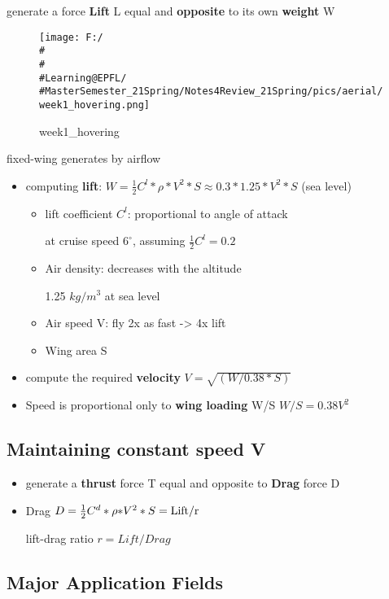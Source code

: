 \documentclass[]{article}
\begin{document}
generate a force \textbf{Lift} L equal and \textbf{opposite} to its own
\textbf{weight} W

\begin{figure}
\centering
\texttt{[image: F:/\\\#\\\#\\\#Learning@EPFL/\\\#MasterSemester\_21Spring/Notes4Review\_21Spring/pics/aerial/week1\_hovering.png]}
\caption{week1\_hovering}
\end{figure}

fixed-wing generates by airflow

\begin{itemize}
\item
  computing \textbf{lift}:
  \(W=\frac{1}{2} C^{l} * \rho {*} V^{2} * S \approx 0.3 * 1.25 * V^2 * S\)
  (sea level)

  \begin{itemize}
  \item
    lift coefficient \(C^{l}\): proportional to angle of attack

    at cruise speed \(6^{\circ}\), assuming \(\frac{1}{2} C^{l}= 0.2\) 
  \item
    Air density: decreases with the altitude

    1.25 \(kg/m^3\) at sea level
  \item
    Air speed V: fly 2x as fast -\textgreater{} 4x lift
  \item
    Wing area S
  \end{itemize}
\item
  compute the required \textbf{velocity} \(V = \sqrt{(W / 0.38 * S)}\)
\item
  Speed is proportional only to \textbf{wing loading} W/S
  \(W/S = 0.38V^2\)
\end{itemize}

\subsection{Maintaining constant speed V}\label{header-n44}

\begin{itemize}
\item
  generate a \textbf{thrust} force T equal and opposite to \textbf{Drag}
  force D
\item
  Drag \(D=\frac{1}{2} C^{d} * \rho {*} V^{2} * S = \rm{Lift}/r \)

  lift-drag ratio \(r = Lift/Drag\)
\end{itemize}

\subsection{Major Application Fields}\label{header-n51}
\end{document}
